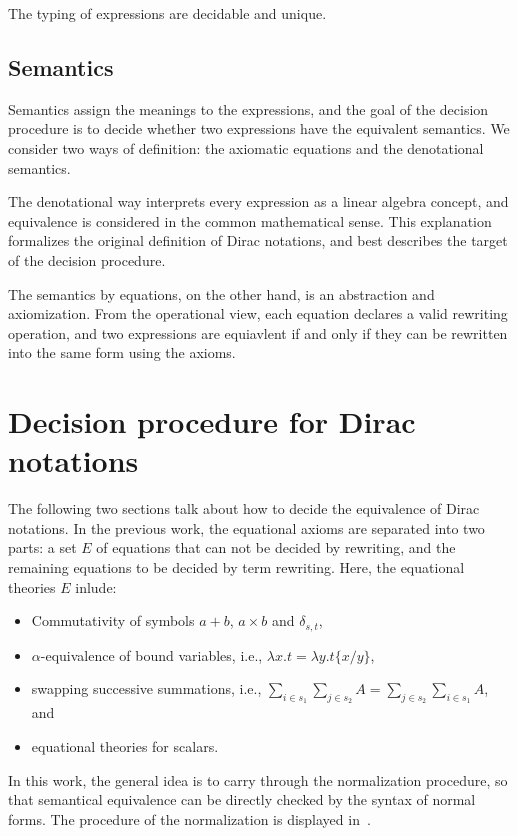 \documentclass[runningheads]{llncs}
\begin{document}
\begin{lemma}
    The typing of expressions are decidable and unique.
\end{lemma}

\subsection{Semantics}

Semantics assign the meanings to the expressions, and the goal of the decision procedure is to decide whether
two expressions have the equivalent semantics. We consider two ways of definition: the axiomatic equations and the denotational semantics.

The denotational way interprets every expression as a linear algebra concept, and equivalence is considered in the common mathematical sense.
This explanation formalizes the original definition of Dirac notations, and best describes the target of the decision procedure.

The semantics by equations, on the other hand, is an abstraction and axiomization. From the operational view, each equation declares a 
valid rewriting operation, and two expressions are equiavlent if and only if they can be rewritten into the same form using the axioms.

\section{Decision procedure for Dirac notations}

The following two sections talk about how to decide the equivalence of Dirac notations.
In the previous work, the equational axioms are separated into two parts: a set $E$ of equations that can not be decided by rewriting, and the remaining equations to be decided by term rewriting.
Here, the equational theories $E$ inlude:
\begin{itemize}
    \item Commutativity of symbols $a + b$, $a\times b$ and $\delta_{s, t}$,
    \item $\alpha$-equivalence of bound variables, i.e., $\lambda x.t = \lambda y . t\{x/y\}$,
    \item swapping successive summations, i.e., $\sum_{i \in s_1} \sum_{j \in s_2} A = \sum_{j \in s_2} \sum_{i \in s_1}A$, and
    \item equational theories for scalars.
\end{itemize}

In this work, the general idea is to carry through the normalization procedure, so that semantical equivalence can be directly checked by the syntax of normal forms. The procedure of the normalization is displayed in~.
\end{document}
